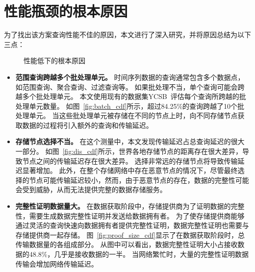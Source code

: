 \section{性能瓶颈的根本原因}
为了找出该方案查询性能不佳的原因，本文进行了深入研究，并将原因总结为以下三点：

\begin{figure*}[t]
    \centering
    \begin{minipage}{1\linewidth}
	    \centering
        \hfill
        \hfill
        \caption{性能低下的根本原因} 
    \end{minipage}
\end{figure*}

\begin{itemize}
    \item \textbf{范围查询跨越多个批处理单元。}
    时间序列数据的查询通常包含多个数据点，如范围查询、聚合查询、过滤查询等。
    如果批处理不当，单个查询可能会跨越多个批处理单元。
    本文使用现有的数据集YCSB~\cite{barata2014ycsb}评估每个查询所跨越的批处理单元数量。
    如图~\autoref{fig:batch_cdf}所示，超过84.25\%的查询跨越了10个批处理单元。
    当这些批处理单元被存储在不同的节点上时，向不同存储节点获取数据的过程将引入额外的查询和传输延迟。

    \item \textbf{存储节点选择不当。}
    在这个测量中，本文发现传输延迟占总查询延迟的很大一部分。
    如图~\autoref{fig:dis_cdf}所示，世界各地存储节点的距离存在很大差异，导致节点之间的传输延迟存在很大差异。
    选择非常远的存储节点将导致传输延迟显著增加。
    此外，在整个存储网络中存在恶意节点的情况下，尽管最终选择的节点可能传输延迟较小，然而，由于恶意节点的存在，数据的完整性可能会受到威胁，从而无法提供完整的数据存储服务。

    \item \textbf{完整性证明数据量大。}
    在数据获取阶段中，存储提供商为了证明数据的完整性，需要生成数据完整性证明并发送给数据拥有者。
    为了使存储提供商能够通过灵活的查询快速向数据拥有者提供完整性证明，数据完整性证明也需要与存储提供商一起存储。
    图~\autoref{fig:proof_size_cdf}显示了在数据获取阶段时，总传输数据量的各组成部分。
    从图中可以看出，数据完整性证明大小占接收数据的48.8\%，几乎是接收数据的一半。
    当网络繁忙时，大量的完整性证明数据传输会增加网络传输延迟。
\end{itemize}

